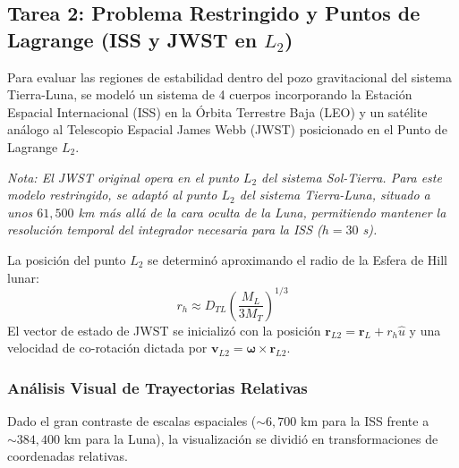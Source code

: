 \documentclass[11pt, a4paper]{article}
\begin{document}
	
	\subsection{Tarea 2: Problema Restringido y Puntos de Lagrange (ISS y JWST en $L_2$)}
	
	Para evaluar las regiones de estabilidad dentro del pozo gravitacional del sistema Tierra-Luna, se modeló un sistema de 4 cuerpos incorporando la Estación Espacial Internacional (ISS) en la Órbita Terrestre Baja (LEO) y un satélite análogo al Telescopio Espacial James Webb (JWST) posicionado en el Punto de Lagrange $L_2$. 
	
	\textit{Nota: El JWST original opera en el punto $L_2$ del sistema Sol-Tierra. Para este modelo restringido, se adaptó al punto $L_2$ del sistema Tierra-Luna, situado a unos $61,500$ km más allá de la cara oculta de la Luna, permitiendo mantener la resolución temporal del integrador necesaria para la ISS ($h = 30$ s).}
	
	La posición del punto $L_2$ se determinó aproximando el radio de la Esfera de Hill lunar:
	\begin{equation}
		r_h \approx D_{TL} \left( \frac{M_L}{3 M_T} \right)^{1/3}
	\end{equation}
	El vector de estado de JWST se inicializó con la posición $\mathbf{r}_{L2} = \mathbf{r}_L + r_h \hat{u}$ y una velocidad de co-rotación dictada por $\mathbf{v}_{L2} = \boldsymbol{\omega} \times \mathbf{r}_{L2}$.
	
	\subsubsection{Análisis Visual de Trayectorias Relativas}
	Dado el gran contraste de escalas espaciales ($\sim 6,700$ km para la ISS frente a $\sim 384,400$ km para la Luna), la visualización se dividió en transformaciones de coordenadas relativas.
	
	
\end{document}
